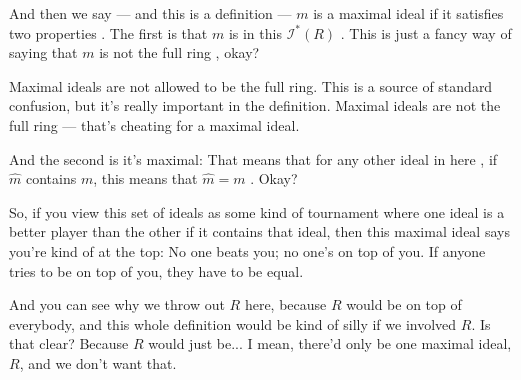 \begin{speech}[00:11:04 - 00:12:36]
And then we say --- and this is a definition --- $m$ is a maximal ideal if it satisfies two properties . The first is that $m$ is in this $\mathscr{I}^*(R)$ . This is just a fancy way of saying that $m$ is not the full ring , okay?

Maximal ideals are not allowed to be the full ring. This is a source of standard confusion, but it's really important in the definition. Maximal ideals are not the full ring --- that's cheating for a maximal ideal.

And the second is it's maximal: That means that for any other ideal in here , if $\hat{m}$ contains $m$, this means that $\hat{m} = m$ . Okay?

So, if you view this set of ideals as some kind of tournament where one ideal is a better player than the other if it contains that ideal, then this maximal ideal says you're kind of at the top: No one beats you; no one's on top of you. If anyone tries to be on top of you, they have to be equal.

And you can see why we throw out $R$ here, because $R$ would be on top of everybody, and this whole definition would be kind of silly if we involved $R$. Is that clear? Because $R$ would just be... I mean, there'd only be one maximal ideal, $R$, and we don't want that.
\end{speech}

\begin{content}

\end{content}

